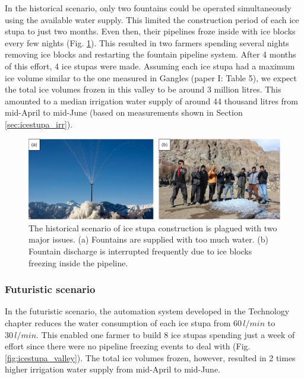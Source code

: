 In the historical scenario, only two fountains could be operated simultaneously using the available water
supply. This limited the construction period of each ice stupa to just two months. Even then, their pipelines
froze inside with ice blocks every few nights (Fig. \ref{fig:issues}). This resulted in two farmers spending several nights
removing ice blocks and restarting the fountain pipeline system. After 4 months of this effort, 4 ice stupas
were made. Assuming each ice stupa had a maximum ice volume similar to the one measured in Gangles (paper I:
Table 5), we expect the total ice volumes frozen in this valley to be around 3 million litres. This amounted to
a median irrigation water supply of around 44 thousand litres from mid-April to mid-June (based on measurements
shown in Section \ref{sec:icestupa_irr}).   

\begin{figure}[htb]
	\includegraphics[width=\textwidth]{figs/construction_issues}

  \caption{The historical scenario of ice stupa construction is plagued with two major issues. (a) Fountains are
  supplied with too much water. (b) Fountain discharge is interrupted frequently due to ice blocks freezing
  inside the pipeline.}

	\label{fig:issues}
\end{figure}

\subsubsection{Futuristic scenario}

In the futuristic scenario, the automation system developed in the Technology chapter reduces the water
consumption of each ice stupa from $60\,l/min$ to $30\,l/min$. This enabled one farmer to build 8 ice stupas
spending just a week of effort since there were no pipeline freezing events to deal with (Fig.
\ref{fig:icestupa_valley}).  The total ice volumes frozen, however, resulted in 2 times higher irrigation water
supply from mid-April to mid-June.


